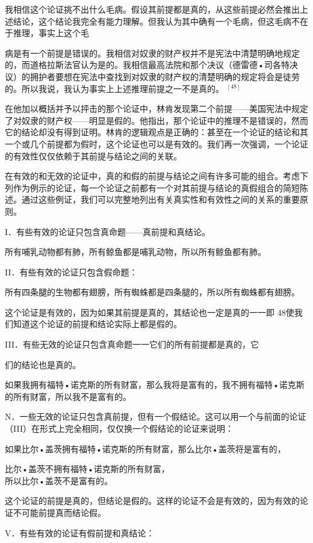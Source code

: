 我相信这个论证挑不出什么毛病。假设其前提都是真的，从这些前提必然会推出上述结论，这个结论我完全有能力理解。但我认为其中确有一个毛病，但这毛病不在于推理，事实上这个毛

病是有一个前提是错误的。我相信对奴隶的财产权并不是宪法中清楚明确地规定的，而道格拉斯法官认为是的。我相信最高法院和那个决议（德雷德•司各特决议）的拥护者要想在宪法中查找到对奴隶的财产权的清楚明确的规定将会是徒劳的。所以我说，我认为事实上上述推理前提之一不是真的。 ${}^{[48]}$

在他加以概括并予以抨击的那个论证中，林肯发现第二个前提——美国宪法中规定了对奴隶的财产权——明显是假的。他指出，那个论证中的推理不是错误的，然而它的结论却没有得到证明。林肯的逻辑观点是正确的：甚至在一个论证的结论和其一个或几个前提都为假时，这个论证也可以是有效的。我们再一次强调，一个论证的有效性仅仅依赖于其前提与结论之间的关联。

在有效的和无效的论证中，真的和假的前提与结论之间有许多可能的组合。考虑下列作为例示的论证，每一个论证之前都有一个对其前提与结论的真假组合的简短陈述。通过这些例证，我们可以完整地列出有关真实性和有效性之间的关系的重要原则。

I．有些有效的论证只包含真命题——真前提和真结论。

所有哺乳动物都有肺，所有鲸鱼都是哺乳动物，所以所有鲸鱼都有肺。

II．有些有效的论证只包含假命题：

所有四条腿的生物都有翅膀，所有蜘蛛都是四条腿的，所以所有蜘蛛都有翅膀。

这个论证是有效的，因为如果其前提是真的，其结论也一定是真的一一即 48使我们知道这个论证的前提和结论实际上都是假的。

III．有些无效的论证只包含真命题一一它们的所有前提都是真的，它

们的结论也是真的。

如果我拥有福特•诺克斯的所有财富，那么我将是富有的，我不拥有福特•诺克斯的所有财富，所以我不是富有的。

N．一些无效的论证只包含真前提，但有一个假结论。这可以用一个与前面的论证（III）在形式上完全相同，仅仅换一个假结论的论证来说明：

如果比尔•盖茨拥有福特•诺克斯的所有财富，那么比尔•盖茨将是富有的，

比尔•盖茨不拥有福特•诺克斯的所有财富，\\
所以比尔•盖茨不是富有的。

这个论证的前提是真的，但结论是假的。这样的论证不会是有效的，因为有效的论证不可能前提真而结论假。

V．有些有效的论证有假前提和真结论：

